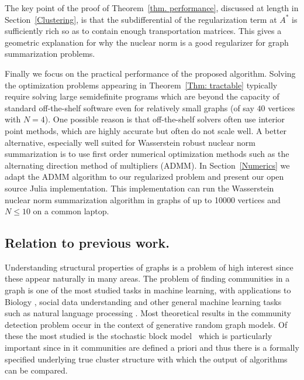 \documentclass[12pt]{amsart}
\theoremstyle{remark}
\begin{document}
The key point of the proof of Theorem~\ref{thm. performance}, discussed at length in Section~\ref{Clustering}, is that the subdifferential of the regularization term at $A^*$ is sufficiently rich so as to contain enough transportation matrices. This gives a geometric explanation for why the nuclear norm is a good regularizer for graph summarization problems.
 
Finally we focus on the practical performance of the proposed algorithm. Solving the optimization problems appearing in Theorem~\ref{Thm: tractable} typically require solving large semidefinite programs which are beyond the  capacity of standard off-the-shelf software even for relatively small graphs (of say $40$ vertices with $N=4$). One possible reason is that off-the-shelf solvers often use interior point methods, which are highly accurate but often do not scale well. A better alternative, especially well suited for Wasserstein robust nuclear norm summarization is to use first order numerical optimization methods such as the alternating direction method of multipliers (ADMM). In Section~\ref{Numerics} we adapt the ADMM algorithm to our regularized problem and present our open source Julia implementation. This implementation can run the Wasserstein nuclear norm summarization algorithm in graphs of up to 10000 vertices and $N\leq 10$ on a common laptop. 

\subsection{Relation to previous work.}
\label{Sec: PreviousWork}

Understanding structural properties of graphs is a problem of high interest since these appear naturally in many areas. The problem of finding communities in a graph is one of the most studied tasks in machine learning, with  applications to Biology \cite{cabreros2016detecting, cline2007integration,xu2002clustering}, social data understanding \cite{domingos2001mining,mishra2007clustering,newman2002random} and other general machine learning tasks such as natural language processing \cite{collobert2011natural,ratinov2009design}. Most theoretical results in the community detection problem occur in the context of generative random graph models. Of these the most studied is the stochastic block model~\cite{abbe2017community} which is particularly important since in it communities are defined a priori and thus there is a formally specified underlying true cluster structure with which the output of algorithms can be compared.
\end{document}
